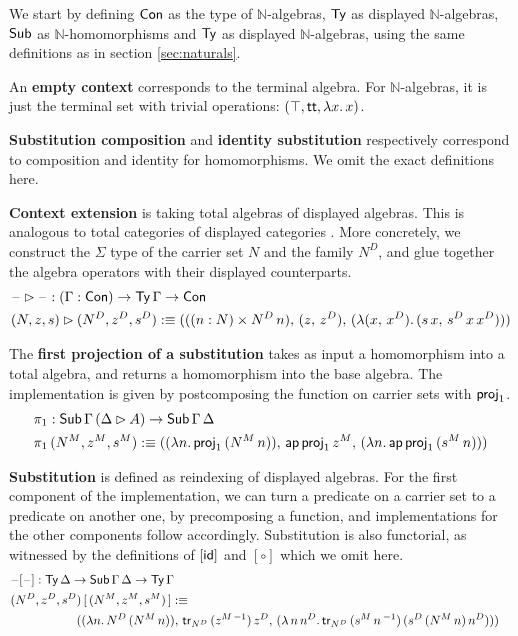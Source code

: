 \documentclass[acmsmall,review,anonymous]{acmart}\settopmatter{printfolios=true,printccs=false,printacmref=false}
\begin{document}
We start by defining $\Con$ as the type of $\mathbb{N}$-algebras,
$\Ty$ as displayed $\mathbb{N}$-algebras, $\Tms$ as
$\mathbb{N}$-homomorphisms and $\Ty$ as displayed
$\mathbb{N}$-algebras, using the same definitions as in section
\ref{sec:naturals}.

An \textbf{empty context} corresponds to the terminal algebra.  For
$\mathbb{N}$-algebras, it is just the terminal set with trivial
operations: $(\top, \tt, \lambda x.\,x)$.

\textbf{Substitution composition} and \textbf{identity substitution}
respectively correspond to composition and identity for
homomorphisms. We omit the exact definitions here.

\textbf{Context extension} is taking total algebras of displayed
algebras. This is analogous to total categories of displayed
categories \cite{displayedCategories}. More concretely, we construct
the $\Sigma$ type of the carrier set $N$ and the family $N^D$, and
glue together the algebra operators with their displayed counterparts.
\begin{alignat*}{5}
  & \blank\rhd \blank : (\Gamma : \Con) \ra \Ty\,\Gamma \ra \Con \\
  & (N, z, s) \rhd (N^D, z^D, s^D) :\equiv
  (((n : N) \times N^D\,n),\,(z,\,z^D),\,(\lambda (x,\,x^D).\,(s\,x,\,s^D\,x\,x^D)))
\end{alignat*}

The \textbf{first projection of a substitution} takes as input a
homomorphism into a total algebra, and returns a homomorphism into the
base algebra. The implementation is given by postcomposing the
function on carrier sets with $\proj_1$.
\begin{alignat*}{5}
  & \pi_1 : \Tms\,\Gamma\,(\Delta\rhd A)\ra\Tms\,\Gamma\,\Delta \\
  & \pi_1\,(N^M, z^M, s^M) :\equiv ((\lambda n.\, \proj_1\,(N^M\,n)),\,\ap\,\proj_1\,z^M,\, (\lambda n.\,\ap\,\proj_1\,(s^M\,n)))
\end{alignat*}

\textbf{Substitution} is defined as reindexing of displayed
algebras. For the first component of the implementation, we can turn a
predicate on a carrier set to a predicate on another one, by
precomposing a function, and implementations for the other components
follow accordingly. Substitution is also functorial, as witnessed by
the definitions of $[\id]$ and $[\circ]$ which we omit here.
\begin{alignat*}{5}
  & \blank[\blank] : \Ty\,\Delta\ra\Tms\,\Gamma\,\Delta\ra\Ty\,\Gamma \\
  & (N^D, z^D, s^D)\,[\,(N^M, z^M, s^M)\,] :\equiv \\
  & && \hspace{-10em}
  ((\lambda n.\,N^D\,(N^M\,n)),\,\tr_{N^D}\,(z^{M\,-1})\,z^D,\,(\lambda\,n\,n^D.\,\tr_{N^D}\,(s^M\,n\,^{-1})\,(s^D\,(N^M\,n)\,n^D)))
\end{alignat*}
\end{document}
